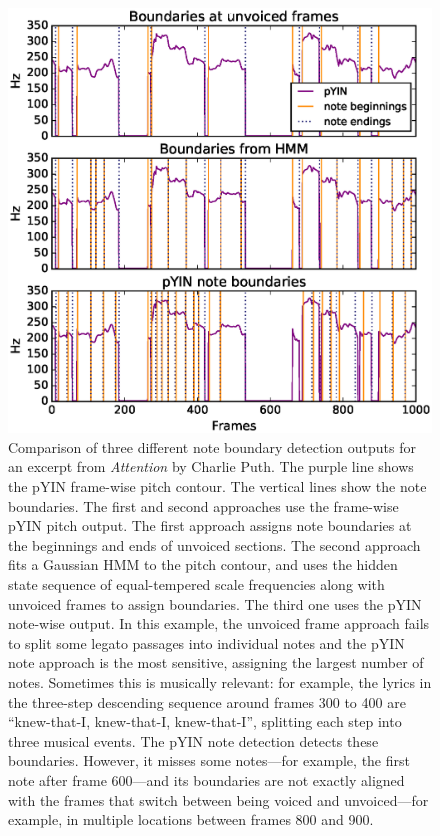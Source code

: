 \begin{figure}[t]
    \centering
    \includegraphics[width=\columnwidth]{figures/note_parse_comparison_attention_5.eps}
    \caption{Comparison of three different note boundary detection outputs for an excerpt from \textit{Attention} by Charlie Puth. The purple line shows the pYIN frame-wise pitch contour. The vertical lines show the note boundaries. The first and second approaches use the frame-wise pYIN pitch output. The first approach assigns note boundaries at the beginnings and ends of unvoiced sections. The second approach fits a Gaussian HMM to the pitch contour, and uses the hidden state sequence of equal-tempered scale frequencies along with unvoiced frames to assign boundaries. The third one uses the pYIN note-wise output. In this example, the unvoiced frame approach fails to split some legato passages into individual notes and the pYIN note approach is the most sensitive, assigning the largest number of notes. Sometimes this is musically relevant: for example, the lyrics in the three-step descending sequence around frames 300 to 400 are ``knew-that-I, knew-that-I, knew-that-I'', splitting each step into three musical events. The pYIN note detection detects these boundaries. However, it misses some notes---for example, the first note after frame 600---and its boundaries are not exactly aligned with the frames that switch between being voiced and unvoiced---for example, in multiple locations between frames 800 and 900.}
    \label{fig:note-parsing}
\end{figure}

